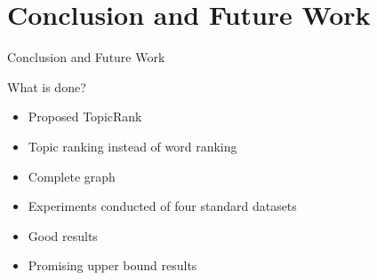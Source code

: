 \section{Conclusion and Future Work}
  \begin{frame}{Conclusion and Future Work}

    What is done?
    \begin{itemize}
      \item{Proposed TopicRank}
      \item{Topic ranking instead of word ranking}
      \item{Complete graph}
      \item{Experiments conducted of four standard datasets}
      \item{Good results}
      \item{Promising upper bound results}
    \end{itemize}

    \vfill

  \end{frame}

